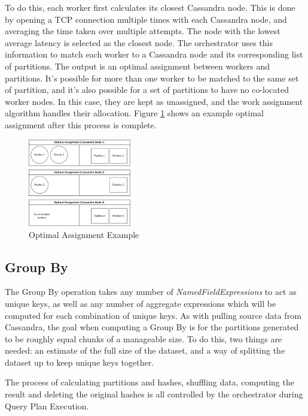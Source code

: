 To do this, each worker first calculates its closest Cassandra node. This is done by opening a TCP connection multiple times with each Cassandra node, and averaging the time taken over multiple attempts. The node with the lowest average latency is selected as the closest node. The orchestrator uses this information to match each worker to a Cassandra node and its corresponding list of partitions. The output is an optimal assignment between workers and partitions. It's possible for more than one worker to be matched to the same set of partition, and it's also possible for a set of partitions to have no co-located worker nodes. In this case, they are kept as unassigned, and the work assignment algorithm handles their allocation. Figure \ref{fig:optimal-assignment-example} shows an example optimal assignment after this process is complete.

\begin{figure}[h]
	\centering
	\includegraphics[width=0.4\textwidth]{chapters/diagrams/implementation/optimal-assignment-example}
	\caption{Optimal Assignment Example}
	\label{fig:optimal-assignment-example}
\end{figure}

\subsection{Group By}\label{subsec:group-by}
The Group By operation takes any number of \textit{NamedFieldExpressions} to act as unique keys, as well as any number of aggregate expressions which will be computed for each combination of unique keys. As with pulling source data from Cassandra, the goal when computing a Group By is for the partitions generated to be roughly equal chunks of a manageable size. To do this, two things are needed: an estimate of the full size of the dataset, and a way of splitting the dataset up to keep unique keys together. 

The process of calculating partitions and hashes, shuffling data, computing the result and deleting the original hashes is all controlled by the orchestrator during Query Plan Execution.

